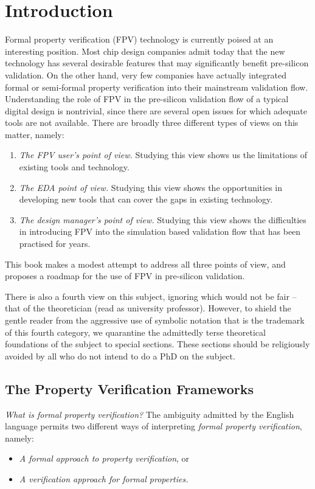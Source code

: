 
\chapter{Introduction}

Formal property verification (FPV) technology is currently poised at an
interesting position. Most chip design companies admit today that the new 
technology has several desirable features that may significantly benefit 
pre-silicon validation. On the other hand, very few companies have actually 
integrated formal or semi-formal property verification into their mainstream 
validation flow. Understanding the role of FPV in the pre-silicon validation 
flow of a typical digital design is nontrivial, since there are several open
issues for which adequate tools are not available. There are broadly three
different types of views on this matter, namely:
\begin{enumerate}

\item {\em The FPV user's point of view.} Studying this view shows us the
	limitations of existing tools and technology.

\item {\em The EDA point of view.} Studying this view shows the opportunities
	in developing new tools that can cover the gaps in existing
	technology.

\item {\em The design manager's point of view.} Studying this view shows
	the difficulties in introducing FPV into the simulation based 
	validation flow that has been practised for years.

\end{enumerate}
This book makes a modest attempt to address all three points of view, and 
proposes a roadmap for the use of FPV in pre-silicon validation. 

There is also a fourth view on this subject, ignoring which would not be 
fair -- that of the theoretician (read as university professor). However, 
to shield the gentle reader from the aggressive use of symbolic notation 
that is the trademark of this fourth category, we quarantine the admittedly 
terse theoretical foundations of the subject to special sections. These 
sections should be religiously avoided by all who do not intend to do a PhD on 
the subject.

\section{The Property Verification Frameworks}
{\em What is formal property verification?} The ambiguity admitted by the
English language permits two different ways of interpreting {\em formal
property verification}, namely:
\begin{itemize}

\item {\em A formal approach to property verification}, or
\item {\em A verification approach for formal properties.}

\end{itemize}




